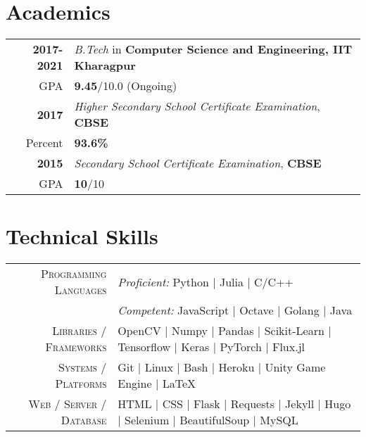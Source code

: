\documentclass[a4paper,10pt]{extarticle} %
\begin{document}
\vspace{-0.6cm}
\section{\textcolor{primary}{Academics}}

\begin{tabular}{r|p{17.5cm}}	
\textbf{2017-2021} & \textit{B.Tech} in \textbf{Computer Science and Engineering, IIT Kharagpur}\\
\hfill GPA & \textbf{9.45}/10.0 (Ongoing)\\
\textbf{2017} & \textit{Higher Secondary School Certificate Examination}, \textbf{CBSE}\\
\hfill Percent & \textbf{93.6\%}\\
\textbf{2015} & \textit{Secondary School Certificate Examination}, \textbf{CBSE}\\
\hfill GPA & \textbf{10}/10 \\
\end{tabular}


\section{\textcolor{primary}{Technical Skills}}

\begin{tabular}{r|p{15cm}}
\textsc{Programming Languages} & \textit{Proficient:} Python | Julia | C/C++ \\
                               & \textit{Competent:} JavaScript | Octave | Golang | Java \\
\textsc{Libraries / Frameworks} & OpenCV | Numpy | Pandas | Scikit-Learn | Tensorflow | Keras | PyTorch | Flux.jl \\
\textsc{Systems / Platforms} & Git | Linux | Bash | Heroku | Unity Game Engine | \LaTeX\\
\textsc{Web / Server / Database} & HTML | CSS | Flask | Requests | Jekyll | Hugo | Selenium | BeautifulSoup | MySQL \\
\end{tabular}

\end{document}
